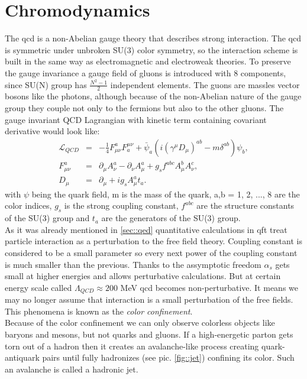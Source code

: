 \section{Chromodynamics}
The \gls{qcd} is a non-Abelian gauge theory that describes strong interaction. The \gls{qcd} is symmetric under unbroken SU(3) color symmetry, so the interaction scheme is built in the same way as electromagnetic and electroweak theories. To preserve the gauge invariance a gauge field of gluons is introduced with 8 components, since SU(N) group has $\frac{N^2-1}{2}$ independent elements. The guons are massles vector bosons like the photons, although because of the non-Abelian nature of the gauge group they couple not only to the fermions but also to the other gluons. The gauge invariant QCD Lagrangian with kinetic term containing covariant derivative would look like:
\begin{equation}
\begin{array}{lll} 
	\mathcal{L}_{QCD} &=& -\frac{1}{4}F^a_{\mu\nu}F_a^{\mu\nu} + \bar\psi_a(i(\gamma^{\mu}D_{\mu})^{ab} - m\delta^{ab})\psi_b,\\
	F^a_{\mu\nu}  &=& \partial_{\mu}A_{\nu}^a-\partial_{\nu}A^a_{\mu}+g_sf^{abc}A^b_{\mu}A^c_{\nu},\\
	D_{\mu} &=& \partial_{\mu} + ig_s A_{\mu}^at_a.
\end{array} 
\end{equation}
with $\psi$ being the quark field, m is the mass of the quark, a,b = 1, 2, ..., 8 are the color indices, $g_s$ is the strong coupling constant, $f^{abc}$ are the structure constants of the SU(3) group and $t_a$ are the generators of the SU(3) group. \\
As it was already mentioned in \ref{sec::qed} quantitative calculations in \gls{qft} treat particle interaction as a perturbation to the free field theory. Coupling constant is considered to be a small parameter so every next power of the coupling constant is much smaller than the previous. Thanks to the assymptotic freedom $\alpha_s$ gets small at higher energies and allows perturbative calculations. But at certain energy scale called $\Lambda_{QCD}\approx200$ MeV \gls{qcd} becomes non-perturbative. It means we may no longer assume that interaction is a small perturbation of the free fields. This phenomena is known as the \textit{color confinement}.\\
Because of the color confinement we can only observe colorless objects like baryons and mesons, but not quarks and gluons. If a high-energetic parton gets torn out of a hadron then it creates an avalanche-like process creating quark-antiquark pairs until fully hadronizes (see pic. \ref{fig::jet}) confining its color. Such an avalanche is called a hadronic jet. \\

